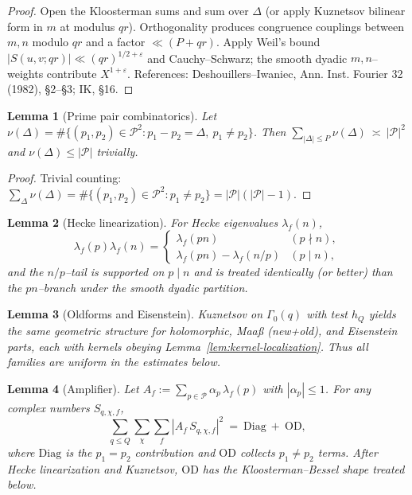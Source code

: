 \documentclass[11pt]{article}
\newtheorem{lemma}{Lemma}[section]
\theoremstyle{definition}
\theoremstyle{remark}
\begin{document}
\begin{proof}
	Open the Kloosterman sums and sum over $\Delta$ (or apply Kuznetsov bilinear form in $m$ at modulus $qr$). Orthogonality produces congruence couplings between $m,n$ modulo $qr$ and a factor $\ll (P+qr)$. Apply Weil’s bound $|S(u,v;qr)|\ll (qr)^{1/2+\varepsilon}$ and Cauchy–Schwarz; the smooth dyadic $m,n$–weights contribute $X^{1+\varepsilon}$. References: Deshouillers–Iwaniec, Ann. Inst. Fourier 32 (1982), §2–§3; IK, §16.
\end{proof}

\begin{lemma}[Prime pair combinatorics]\label{lem:prime-pair}
	Let $\nu(\Delta)=\#\{(p_1,p_2)\in\mathcal P^2: p_1-p_2=\Delta,\ p_1\ne p_2\}$. Then
	\(
	\sum_{|\Delta|\le P}\nu(\Delta)\ \asymp\ |\mathcal P|^2
	\)
	and $\nu(\Delta)\le |\mathcal P|$ trivially.
\end{lemma}

\begin{proof}
	Trivial counting: $\sum_{\Delta}\nu(\Delta)=\#\{(p_1,p_2)\in\mathcal P^2: p_1\ne p_2\}=|\mathcal P|(|\mathcal P|-1)$.
\end{proof}

\begin{lemma}[Hecke linearization]\label{lem:hecke-linearization}
	For Hecke eigenvalues $\lambda_f(n)$,
	\[
		\lambda_f(p)\lambda_f(n)=
		\begin{cases}
			\lambda_f(pn)                & (p\nmid n), \\
			\lambda_f(pn)-\lambda_f(n/p) & (p\mid n),
		\end{cases}
	\]
	and the $n/p$–tail is supported on $p\mid n$ and is treated identically (or better) than the $pn$–branch under the smooth dyadic partition.
\end{lemma}

\begin{lemma}[Oldforms and Eisenstein]\label{lem:old-eis}
	Kuznetsov on $\Gamma_0(q)$ with test $h_Q$ yields the same geometric structure for holomorphic, Maaß (new+old), and Eisenstein parts, each with kernels obeying Lemma~\ref{lem:kernel-localization}. Thus all families are uniform in the estimates below.
\end{lemma}

\begin{lemma}[Amplifier]\label{lem:amplifier}
	Let $A_f:=\sum_{p\in\mathcal P}\alpha_p\,\lambda_f(p)$ with $|\alpha_p|\le 1$. For any complex numbers $S_{q,\chi,f}$,
	\[
		\sum_{q\le Q}\sum_{\chi}\sum_f |A_f\,S_{q,\chi,f}|^2
		\ =\ \mathrm{Diag}\ +\ \mathrm{OD},
	\]
	where $\mathrm{Diag}$ is the $p_1=p_2$ contribution and $\mathrm{OD}$ collects $p_1\ne p_2$ terms. After Hecke linearization and Kuznetsov, $\mathrm{OD}$ has the Kloosterman–Bessel shape treated below.
\end{lemma}
\end{document}

